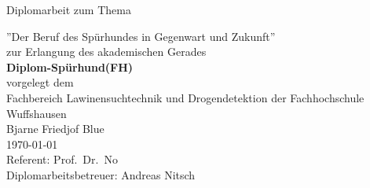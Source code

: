 
\hypersetup{pageanchor=false}%
\begin{titlepage}
\vspace{4em}
\center%
\Large{\textsf{Diplomarbeit zum Thema}}
\vspace{1em}

\Huge{\textsf{''Der Beruf des Spürhundes in Gegenwart und Zukunft''}}
\vspace{2em}
\\
\Large{
	\textsf{
		zur Erlangung des akademischen Gerades\\
		\textbf{Diplom-Spürhund(FH)}
		\vspace{2em}
		\\
		vorgelegt dem\\
		Fachbereich Lawinensuchtechnik und Drogendetektion der Fachhochschule Wuffshausen
		}
	}
\vspace{2em}
\\
\Large{
	\textsf{
		Bjarne Friedjof Blue\\
		\today
		\vspace{2em}
		\\
		Referent: Prof.~Dr.~No\\
		Diplomarbeitsbetreuer: Andreas Nitsch
	}
}

\end{titlepage}
\hypersetup{pageanchor=true}
